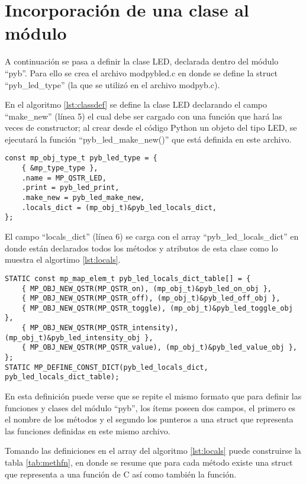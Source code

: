 \section{Incorporación de una clase al módulo}

A continuación se pasa a definir la clase LED, declarada dentro del módulo “pyb”. Para ello se crea el archivo modpybled.c en donde se define la struct “pyb\_led\_type” (la que se utilizó en el archivo modpyb.c).

En el algoritmo \ref{lst:classdef} se define la clase LED declarando el campo “make\_new” (línea 5) el cual debe ser cargado con una función que hará las veces de constructor; al crear desde el código Python un objeto del tipo LED, se ejecutará la función “pyb\_led\_make\_new()” que está definida en este archivo.

\begin{lstlisting}[label={lst:classdef},caption=Estructura que define la clase LED.] 
const mp_obj_type_t pyb_led_type = {
    { &mp_type_type },
    .name = MP_QSTR_LED,
    .print = pyb_led_print,
    .make_new = pyb_led_make_new,
    .locals_dict = (mp_obj_t)&pyb_led_locals_dict,
};
\end{lstlisting}

El campo “locals\_dict” (línea 6) se carga con el array “pyb\_led\_locals\_dict” en donde están declarados todos los métodos y atributos de esta clase como lo muestra el algortimo \ref{lst:locals}.

\begin{lstlisting}[label={lst:locals},caption=Definición de métodos de la clase LED.] 
STATIC const mp_map_elem_t pyb_led_locals_dict_table[] = {
    { MP_OBJ_NEW_QSTR(MP_QSTR_on), (mp_obj_t)&pyb_led_on_obj },
    { MP_OBJ_NEW_QSTR(MP_QSTR_off), (mp_obj_t)&pyb_led_off_obj },
    { MP_OBJ_NEW_QSTR(MP_QSTR_toggle), (mp_obj_t)&pyb_led_toggle_obj },
    { MP_OBJ_NEW_QSTR(MP_QSTR_intensity), (mp_obj_t)&pyb_led_intensity_obj },
    { MP_OBJ_NEW_QSTR(MP_QSTR_value), (mp_obj_t)&pyb_led_value_obj },
};
STATIC MP_DEFINE_CONST_DICT(pyb_led_locals_dict,         pyb_led_locals_dict_table);
\end{lstlisting}

En esta definición puede verse que se repite el mismo formato que para definir las funciones y clases del módulo “pyb”, los ítems poseen dos campos, el primero es el nombre de los métodos y el segundo los punteros a una struct que representa las funciones definidas en este mismo archivo.

Tomando las definiciones en el array del algoritmo \ref{lst:locals} puede construirse la tabla \ref{tab:methfn}, en donde se resume que para cada método existe una struct que representa a una función de C así como también la función.

